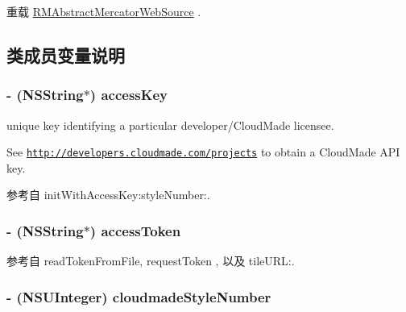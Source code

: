 重载 \hyperlink{interface_r_m_abstract_mercator_web_source_acf45b84d8f39ef7fcc2a92a2e320a9a2}{R\-M\-Abstract\-Mercator\-Web\-Source} .



\subsection{类成员变量说明}
\hypertarget{interface_r_m_cloud_made_map_source_a4efefbc741e320d977cf04e9a96e02d0}{
\subsubsection[{access\-Key}]{\setlength{\rightskip}{0pt plus 5cm}-\/ (N\-S\-String$\ast$) access\-Key\hspace{0.3cm}{\ttfamily [protected]}}}\label{interface_r_m_cloud_made_map_source_a4efefbc741e320d977cf04e9a96e02d0}


unique key identifying a particular developer/\-Cloud\-Made licensee. 

See \href{http://developers.cloudmade.com/projects}{\tt http\-://developers.\-cloudmade.\-com/projects} to obtain a Cloud\-Made A\-P\-I key. 

参考自 init\-With\-Access\-Key\-:style\-Number\-:.

\hypertarget{interface_r_m_cloud_made_map_source_ac3deb46e005ea4bdf67c0e32b4ab7406}{
\subsubsection[{access\-Token}]{\setlength{\rightskip}{0pt plus 5cm}-\/ (N\-S\-String$\ast$) access\-Token\hspace{0.3cm}{\ttfamily [protected]}}}\label{interface_r_m_cloud_made_map_source_ac3deb46e005ea4bdf67c0e32b4ab7406}


参考自 read\-Token\-From\-File, request\-Token , 以及 tile\-U\-R\-L\-:.

\hypertarget{interface_r_m_cloud_made_map_source_a8fb92e3c3ae01146bc6a02bb437caec1}{
\subsubsection[{cloudmade\-Style\-Number}]{\setlength{\rightskip}{0pt plus 5cm}-\/ (N\-S\-U\-Integer) cloudmade\-Style\-Number\hspace{0.3cm}{\ttfamily [protected]}}}\label{interface_r_m_cloud_made_map_source_a8fb92e3c3ae01146bc6a02bb437caec1}


